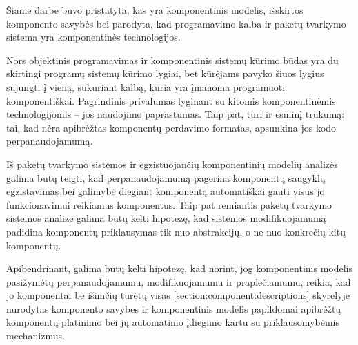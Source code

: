 

Šiame darbe buvo pristatyta, kas yra komponentinis modelis, išskirtos
komponento savybės bei parodyta, kad  programavimo
kalba ir  paketų tvarkymo sistema yra komponentinės
technologijos.

Nors objektinis programavimas ir komponentinis sistemų kūrimo būdas
yra du skirtingi programų sistemų kūrimo lygiai, bet
 kūrėjams pavyko šiuos lygius sujungti į vieną,
sukuriant kalbą, kuria yra įmanoma programuoti komponentiškai.
Pagrindinis  privalumas lyginant su kitomis
komponentinėmis technologijomis – jos naudojimo paprastumas. Taip pat,
 turi ir esminį trūkumą: tai, kad nėra apibrėžtas
 komponentų perdavimo formatas, apsunkina jos kodo
perpanaudojamumą.

Iš  paketų tvarkymo sistemos ir egzistuojančių
komponentinių modelių analizės galima būtų teigti, kad
perpanaudojamumą pagerina komponentų saugyklų egzistavimas bei galimybė
diegiant komponentą automatiškai gauti visus jo funkcionavimui
reikiamus komponentus. Taip pat remiantis  paketų
tvarkymo sistemos analize galima būtų kelti hipotezę, kad
sistemos modifikuojamumą padidina komponentų priklausymas tik nuo
abstrakcijų, o ne nuo konkrečių kitų komponentų.

Apibendrinant, galima būtų kelti hipotezę, kad norint, jog
komponentinis modelis pasižymėtų perpanaudojamumu, modifikuojamumu ir
praplečiamumu, reikia, kad jo komponentai be išimčių turėtų visas
\ref{section:component:descriptions} skyrelyje nurodytas komponento
savybes ir komponentinis modelis papildomai apibrėžtų komponentų
platinimo bei jų automatinio įdiegimo kartu su priklausomybėmis
mechanizmus.
